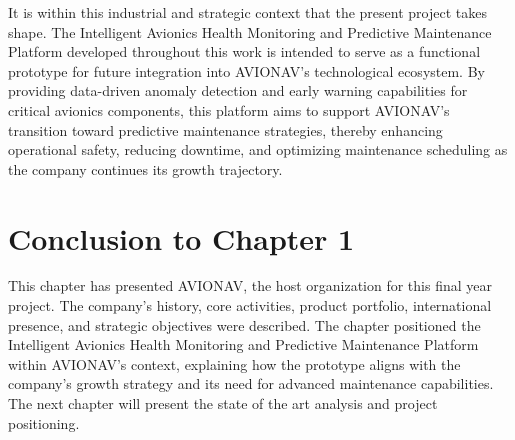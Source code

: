 It is within this industrial and strategic context that the present project takes shape. The Intelligent Avionics Health Monitoring and Predictive Maintenance Platform developed throughout this work is intended to serve as a functional prototype for future integration into AVIONAV's technological ecosystem. By providing data-driven anomaly detection and early warning capabilities for critical avionics components, this platform aims to support AVIONAV's transition toward predictive maintenance strategies, thereby enhancing operational safety, reducing downtime, and optimizing maintenance scheduling as the company continues its growth trajectory.

\section*{Conclusion to Chapter 1}

This chapter has presented AVIONAV, the host organization for this final year project. The company's history, core activities, product portfolio, international presence, and strategic objectives were described. The chapter positioned the Intelligent Avionics Health Monitoring and Predictive Maintenance Platform within AVIONAV's context, explaining how the prototype aligns with the company's growth strategy and its need for advanced maintenance capabilities. The next chapter will present the state of the art analysis and project positioning.
